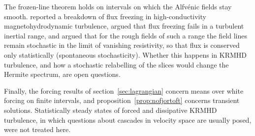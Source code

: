 The frozen-line theorem holds on intervals on which the Alfv\'enic fields stay smooth. \citet{Eyink2013} reported a breakdown of flux freezing in high-conductivity magnetohydrodynamic turbulence, \citet{Eyink2018} argued that flux freezing fails in a turbulent inertial range, and \citet{Jafari2026} argued that for the rough fields of such a range the field lines remain stochastic in the limit of vanishing resistivity, so that flux is conserved only statistically (spontaneous stochasticity). Whether this happens in KRMHD turbulence, and how a stochastic relabelling of the slices would change the Hermite spectrum, are open questions.

Finally, the forcing results of section~\ref{sec:lagrangian} concern means over white forcing on finite intervals, and proposition~\ref{prop:nofjortoft} concerns transient solutions. Statistically steady states of forced and dissipative KRMHD turbulence, in which questions about cascades in velocity space are usually posed, were not treated here.

